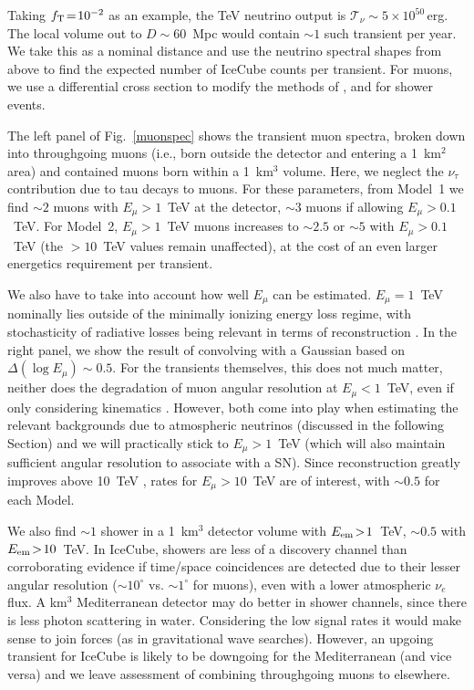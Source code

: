 \documentclass[aps,prd,nofootinbib,twocolumn,floatfix,letterpaper,superscriptaddress,showpacs]{revtex4}
\begin{document}
Taking $f_{\rm T} \!=\! 10^{-2}$ as an example, the TeV neutrino output is $\mathcal{T}_\nu \!\sim\! 5 \!\times\! 10^{50}\,$erg.  The local volume out to $D \!\sim\! 60$~Mpc would contain $\sim\! 1$ such transient per year.  We take this as a nominal distance and use the neutrino spectral shapes from above to find the expected number of IceCube counts per transient.  For muons, we use a differential cross section \cite{Gandhi:1995tf,Gandhi:1998ri} to modify the methods of \cite{Kistler2006,Beacom:2007yu,Kistler2016}, and \cite{Kistler2014} for shower events.

The left panel of Fig.~\ref{muonspec} shows the transient muon spectra, broken down into throughgoing muons (i.e., born outside the detector and entering a 1~km$^2$ area) and contained muons born within a 1~km$^3$ volume.  Here, we neglect the $\nu_\tau$ contribution due to tau decays to muons.
For these parameters, from Model~1 we find $\sim\! 2$ muons with $E_\mu \!>\! 1$~TeV at the detector, $\sim\! 3$ muons if allowing $E_\mu \!>\! 0.1$~TeV.
For Model~2, $E_\mu \!>\! 1$~TeV muons increases to $\sim\! 2.5$ or $\sim\! 5$ with $E_\mu \!>\! 0.1$~TeV (the $>\! 10$~TeV values remain unaffected), at the cost of an even larger energetics requirement per transient.

We also have to take into account how well $E_\mu$ can be estimated.  $E_\mu \!=\! 1$~TeV nominally lies outside of the minimally ionizing energy loss regime, with stochasticity of radiative losses being relevant in terms of reconstruction \cite{Aartsen:2013vja}.
In the right panel, we show the result of convolving with a Gaussian based on $\Delta (\log{E_\mu}) \!\sim\! 0.5$.  For the transients themselves, this does not much matter, neither does the degradation of muon angular resolution at $E_\mu \!<\! 1$~TeV, even if only considering kinematics \cite{Gaisser:1990vg}.
However, both come into play when estimating the relevant backgrounds due to atmospheric neutrinos (discussed in the following Section) and we will practically stick to $E_\mu \!>\! 1$~TeV (which will also maintain sufficient angular resolution to associate with a SN).  Since reconstruction greatly improves above 10~TeV \cite{Aartsen:2013vja}, rates for $E_\mu \!>\! 10$~TeV are of interest, with $\sim\! 0.5$ for each Model.

We also find $\sim\! 1$ shower in a 1~km$^3$ detector volume with $E_{\rm em} \!>\! 1$~TeV, $\sim\! 0.5$ with $E_{\rm em} \!>\! 10$~TeV.  In IceCube, showers are less of a discovery channel than corroborating evidence if time/space coincidences are detected due to their lesser angular resolution ($\sim\! 10^\circ$ vs. $\sim\! 1^\circ$ for muons), even with a lower atmospheric $\nu_e$ flux.  A km$^3$ Mediterranean detector \cite{Coniglione:2015aqa} may do better in shower channels, since there is less photon scattering in water.  Considering the low signal rates it would make sense to join forces (as in gravitational wave searches).  However, an upgoing transient for IceCube is likely to be downgoing for the Mediterranean (and vice versa) and we leave assessment of combining throughgoing muons to elsewhere.
\end{document}
